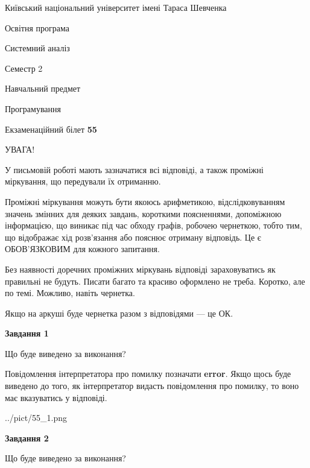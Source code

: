 \documentclass[12pt, ukrainian]{article}
\begin{document}
{{\begin {small}\par
{ \center  Київський національний університет імені Тараса Шевченка \par}
{\parbox {5 cm}{Освітня програма \hfill}{\parbox {7 cm}{Системний аналіз \hfill}}\parbox {6 cm}{\hfill Семестр 2}}\par
{\parbox {5 cm} {Навчальний предмет \hfill}\parbox {7 cm}{Програмування \hfill}\parbox {6cm}{\hfill}\par}\vspace{-7pt} \end{small}}{\center Екзаменаційний білет \No \textbf
{ 55 }\par}}
{
\begin {large}
УВАГА!

У письмовій роботі мають зазначатися всі відповіді, а також проміжні міркування, що передували їх отриманню.

Проміжні міркування можуть бути якоюсь арифметикою, відслідковуванням зна\-чень змінних для деяких завдань,
короткими поясненнями, допоміжною інформацією, що виникає під час обходу графів, робочею чернеткою,
тобто тим, що відображає хід розв’язання або пояснює отриману відповідь.
Це є ОБОВ’ЯЗКОВИМ для кожного запитання.

Без наявності доречних проміжних міркувань відповіді зараховуватись як правиль\-ні не будуть.
Писати багато та красиво оформлено не треба. Коротко, але по темі. Можли\-во, навіть чернетка.

Якщо на аркуші буде чернетка разом з відповідями --- це ОК.

\newpage

{\begin {center}\textbf{Завдання 1}\end {center}}\par
Що буде виведено за виконання?

Повідомлення інтерпретатора про помилку позначати \textbf{error}.
Якщо щось буде виведено до того, як інтерпретатор видасть повідомлення про помилку, 
то воно має вказуватись у відповіді. \par


\begin{center}
	{../pict/55_1.png}
\end{center}
\newpage

{\begin {center}\textbf{Завдання 2}\end {center}}\par
Що буде виведено за виконання?


\end{large}}
\end{document}
